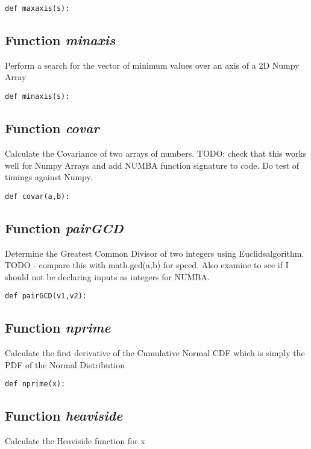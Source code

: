 \documentclass[twoside,11pt]{book}
\begin{document}
\begin{lstlisting}
def maxaxis(s):
\end{lstlisting}

\subsection{Function {\it minaxis}}
Perform a search for the vector of minimum values over an axis of a 2D Numpy Array 

\begin{lstlisting}
def minaxis(s):
\end{lstlisting}

\subsection{Function {\it covar}}
Calculate the Covariance of two arrays of numbers. TODO: check that this works well for Numpy Arrays and add NUMBA function signature to code. Do test of timings against Numpy. 

\begin{lstlisting}
def covar(a,b):
\end{lstlisting}

\subsection{Function {\it pairGCD}}
Determine the Greatest Common Divisor of two integers using Euclidsalgorithm. TODO - compare this with math.gcd(a,b) for speed. Also examine to see if I should not be declaring inputs as integers for NUMBA. 

\begin{lstlisting}
def pairGCD(v1,v2):
\end{lstlisting}

\subsection{Function {\it nprime}}
Calculate the first derivative of the Cumulative Normal CDF which is simply the PDF of the Normal Distribution 

\begin{lstlisting}
def nprime(x):
\end{lstlisting}

\subsection{Function {\it heaviside}}
Calculate the Heaviside function for x 
\end{document}

